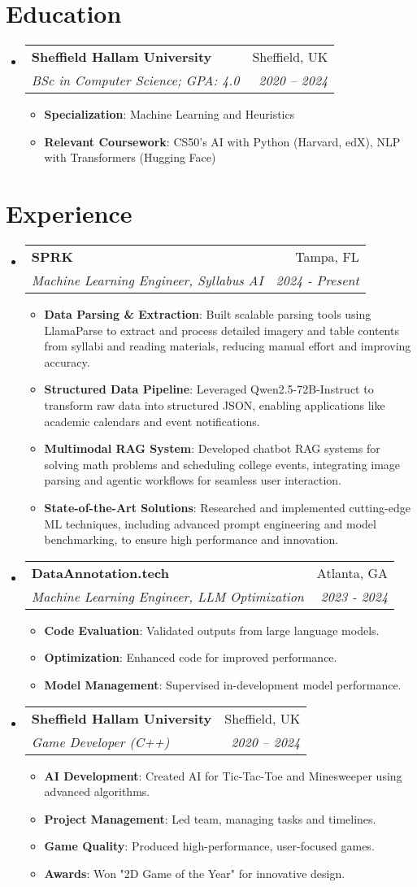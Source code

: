 \documentclass[letterpaper,11pt]{article}
\makeatletter
\newcommand{\resumeItem}[2]{
  \item\small{
    \textbf{#1}{: #2 \vspace{-2pt}}
  }
}
\newcommand{\resumeSubheading}[4]{
  \vspace{-1pt}\item
    \begin{tabular*}{0.97\textwidth}{l@{\extracolsep{\fill}}r}
      \textbf{#1} & #2 \\
      \textit{\small#3} & \textit{\small #4} \\
    \end{tabular*}\vspace{-5pt}
}
\newcommand{\resumeSubHeadingListStart}{\begin{itemize}[leftmargin=*, itemsep=0pt]}
\newcommand{\resumeSubHeadingListEnd}{\end{itemize}}
\newcommand{\resumeItemListStart}{\begin{itemize}[itemsep=0pt]}
\newcommand{\resumeItemListEnd}{\end{itemize}\vspace{-5pt}}
\makeatother
\begin{document}
\section{Education}
 \resumeSubHeadingListStart
    \resumeSubheading
      {Sheffield Hallam University}{Sheffield, UK}
      {BSc in Computer Science; GPA: 4.0}{2020 -- 2024}
      \resumeItemListStart
        \resumeItem{Specialization}{Machine Learning and Heuristics}
        \resumeItem{Relevant Coursework}{CS50's AI with Python (Harvard, edX), NLP with Transformers (Hugging Face)}
      \resumeItemListEnd
  \resumeSubHeadingListEnd
\vspace{-0.5cm} %

\section{Experience}
\resumeSubHeadingListStart
\resumeSubheading
{SPRK}{Tampa, FL}
{Machine Learning Engineer, Syllabus AI}{2024 - Present}
\resumeItemListStart
\resumeItem{Data Parsing \& Extraction}{Built scalable parsing tools using LlamaParse to extract and process detailed imagery and table contents from syllabi and reading materials, reducing manual effort and improving accuracy.}
\resumeItem{Structured Data Pipeline}{Leveraged Qwen2.5-72B-Instruct to transform raw data into structured JSON, enabling applications like academic calendars and event notifications.}
\resumeItem{Multimodal RAG System}{Developed chatbot RAG systems for solving math problems and scheduling college events, integrating image parsing and agentic workflows for seamless user interaction.}
\resumeItem{State-of-the-Art Solutions}{Researched and implemented cutting-edge ML techniques, including advanced prompt engineering and model benchmarking, to ensure high performance and innovation.}
\resumeItemListEnd
\resumeSubHeadingListEnd
\vspace{-0.3cm}
\resumeSubHeadingListStart  
    \resumeSubheading
      {DataAnnotation.tech}{Atlanta, GA}
      {Machine Learning Engineer, LLM Optimization}{2023 - 2024}
      \resumeItemListStart
        \resumeItem{Code Evaluation}{Validated outputs from large language models.}
        \resumeItem{Optimization}{Enhanced code for improved performance.}
        \resumeItem{Model Management}{Supervised in-development model performance.}
      \resumeItemListEnd

    \resumeSubheading
      {Sheffield Hallam University}{Sheffield, UK}
      {Game Developer (C++)}{2020 -- 2024}
      \resumeItemListStart
        \resumeItem{AI Development}{Created AI for Tic-Tac-Toe and Minesweeper using advanced algorithms.}
        \resumeItem{Project Management}{Led team, managing tasks and timelines.}
        \resumeItem{Game Quality}{Produced high-performance, user-focused games.}
        \resumeItem{Awards}{Won "2D Game of the Year" for innovative design.}
      \resumeItemListEnd
  \resumeSubHeadingListEnd
\vspace{-0.6cm}
\end{document}
